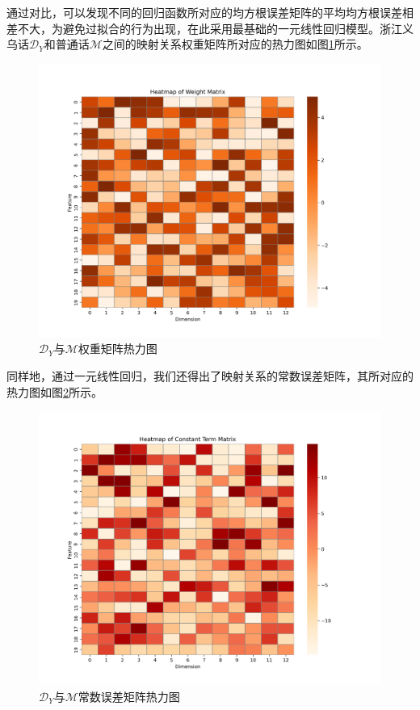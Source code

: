 \documentclass[lang=cn,cite=super]{elegantpaper}
\begin{document}
通过对比，可以发现不同的回归函数所对应的均方根误差矩阵的平均均方根误差相差不大，为避免过拟合的行为出现，在此采用最基础的一元线性回归模型。浙江义乌话$\mathcal{D}_Y$和普通话$\mathcal{M}$之间的映射关系权重矩阵所对应的热力图如图\ref{fig:heatmap_weight}所示。
\begin{figure}[h]
    \caption{\label{fig:heatmap_weight} $\mathcal{D}_Y$与$\mathcal{M}$权重矩阵热力图}
    \centering
    \includegraphics[scale=0.35]{Weight_Matrix_Heatmap.png}
\end{figure}

同样地，通过一元线性回归，我们还得出了映射关系的常数误差矩阵，其所对应的热力图如图\ref{fig:heatmap_constant}所示。
\begin{figure}[h]
    \caption{\label{fig:heatmap_constant} $\mathcal{D}_Y$与$\mathcal{M}$常数误差矩阵热力图}
    \centering
    \includegraphics[scale=0.35]{Error_Matrix_Heatmap.png}
\end{figure}
\end{document}
